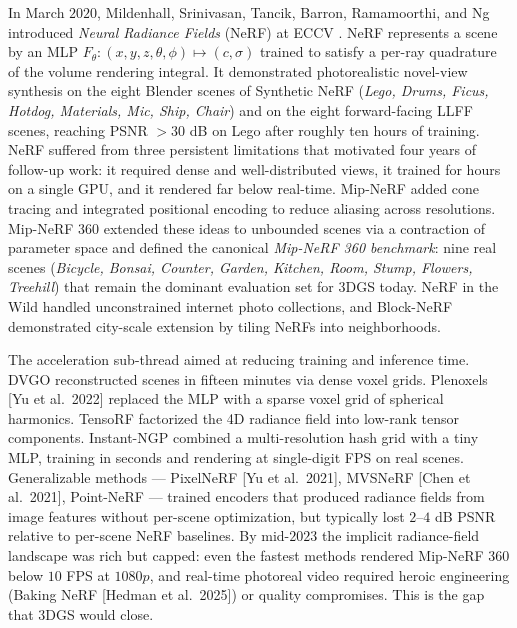 \documentclass{article}
\begin{document}
In March \(2020\), Mildenhall, Srinivasan, Tancik, Barron, Ramamoorthi, and Ng introduced \emph{Neural Radiance Fields} (NeRF) at ECCV \cite{mildenhall2020nerfrepresentingsc}. NeRF represents a scene by an MLP \(F_\theta:(x,y,z,\theta,\phi)\mapsto(c,\sigma)\) trained to satisfy a per-ray quadrature of the volume rendering integral. It demonstrated photorealistic novel-view synthesis on the eight Blender scenes of Synthetic NeRF (\emph{Lego, Drums, Ficus, Hotdog, Materials, Mic, Ship, Chair}) and on the eight forward-facing LLFF scenes, reaching PSNR \(>30\) dB on Lego after roughly ten hours of training. NeRF suffered from three persistent limitations that motivated four years of follow-up work: it required dense and well-distributed views, it trained for hours on a single GPU, and it rendered far below real-time. Mip-NeRF \cite{barron2021mipnerfamultiscale} added cone tracing and integrated positional encoding to reduce aliasing across resolutions. Mip-NeRF 360 \cite{barron2022mipnerf360unbounde} extended these ideas to unbounded scenes via a contraction of parameter space and defined the canonical \emph{Mip-NeRF 360 benchmark}: nine real scenes (\emph{Bicycle, Bonsai, Counter, Garden, Kitchen, Room, Stump, Flowers, Treehill}) that remain the dominant evaluation set for 3DGS today. NeRF in the Wild \cite{martinbrualla2021nerfinthewildneura} handled unconstrained internet photo collections, and Block-NeRF \cite{tancik2022blocknerfscalablel} demonstrated city-scale extension by tiling NeRFs into neighborhoods.

The acceleration sub-thread aimed at reducing training and inference time. DVGO \cite{sun2022directvoxelgridopt} reconstructed scenes in fifteen minutes via dense voxel grids. Plenoxels {[}Yu et al.~2022{]} replaced the MLP with a sparse voxel grid of spherical harmonics. TensoRF \cite{chen2022tensorftensorialra} factorized the 4D radiance field into low-rank tensor components. Instant-NGP \cite{mller2022instantneuralgraph} combined a multi-resolution hash grid with a tiny MLP, training in seconds and rendering at single-digit FPS on real scenes. Generalizable methods --- PixelNeRF {[}Yu et al.~2021{]}, MVSNeRF {[}Chen et al.~2021{]}, Point-NeRF \cite{xu2022pointnerfpointbase} --- trained encoders that produced radiance fields from image features without per-scene optimization, but typically lost \(2\)--\(4\) dB PSNR relative to per-scene NeRF baselines. By mid-\(2023\) the implicit radiance-field landscape was rich but capped: even the fastest methods rendered Mip-NeRF 360 below \(10\) FPS at \(1080p\), and real-time photoreal video required heroic engineering (Baking NeRF {[}Hedman et al.~2025{]}) or quality compromises. This is the gap that 3DGS would close.
\end{document}
